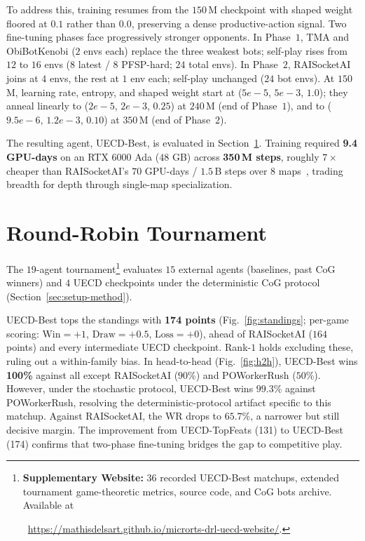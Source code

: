 \documentclass[conference]{IEEEtran}
\newif\ifanonymous
\newcommand{\code}[1]{{\ttfamily\hyphenchar\font=45\relax #1}}
\begin{document}
To address this, training resumes from the $150$\,M checkpoint with shaped weight floored at $0.1$ rather than $0.0$, preserving a dense productive-action signal. Two fine-tuning phases face progressively stronger opponents. In Phase~$1$, TMA and ObiBotKenobi ($2$ envs each) replace the three weakest bots; self-play rises from $12$ to $16$ envs ($8$ latest / $8$ PFSP-hard; $24$ total envs). In Phase~$2$, RAISocketAI joins at $4$ envs, the rest at $1$ env each; self-play unchanged ($24$ bot envs). At $150$\,M, learning rate, entropy, and shaped weight start at ($5e{-}5$, $5e{-}3$, $1.0$); they anneal linearly to ($2e{-}5$, $2e{-}3$, $0.25$) at $240$\,M (end of Phase~$1$), and to ($9.5e{-}6$, $1.2e{-}3$, $0.10$) at $350$\,M (end of Phase~$2$).

The resulting agent, \code{UECD-Best}, is evaluated in Section~\ref{sec:tournament}. Training required \textbf{9.4 GPU-days} on an RTX $6000$ Ada ($48$ GB) across \textbf{350\,M steps}, roughly $7\times$ cheaper than RAISocketAI's $70$ GPU-days / $1.5$\,B steps over $8$ maps~\cite{goodfriendCompetitionWinningDeep2024}, trading breadth for depth through single-map specialization.

\section{Round-Robin Tournament}
\label{sec:tournament}

The $19$-agent tournament\footnote{\textbf{Supplementary Website:} $36$ recorded \code{UECD-Best} matchups, extended tournament game-theoretic metrics, source code, and CoG bots archive. Available at%
  \ifanonymous
    ~[URL \textit{anonymized} for double-blind review].%
  \else
    ~\url{https://mathisdelsart.github.io/microrts-drl-uecd-website/}.%
  \fi
  }
evaluates $15$ external agents (baselines, past CoG winners) and $4$ UECD checkpoints under the deterministic CoG protocol (Section~\ref{sec:setup-method}).

\code{UECD-Best} tops the standings with \textbf{174 points} (Fig.~\ref{fig:standings}; per-game scoring: $\text{Win}=+1$, $\text{Draw}=+0.5$, $\text{Loss}=+0$), ahead of RAISocketAI ($164$ points) and every intermediate \code{UECD} checkpoint. Rank-$1$ holds excluding these, ruling out a within-family bias. In head-to-head (Fig.~\ref{fig:h2h}), \code{UECD-Best} wins \textbf{100\%} against all except RAISocketAI ($90$\%) and POWorkerRush ($50$\%). However, under the stochastic protocol, \code{UECD-Best} wins $99.3$\% against POWorkerRush, resolving the deterministic-protocol artifact specific to this matchup. Against RAISocketAI, the WR drops to $65.7$\%, a narrower but still decisive margin. The improvement from \code{UECD-TopFeats} (131) to \code{UECD-Best} (174) confirms that two-phase fine-tuning bridges the gap to competitive play.
\end{document}
